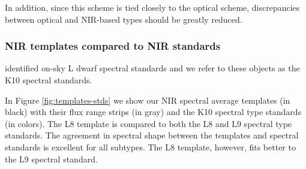 \documentclass[12pt,preprint]{aastex}
\begin{document}
	


In addition, since this scheme is tied closely to the optical scheme, discrepancies between optical and NIR-based types should be greatly reduced.

\subsubsection{NIR templates compared to NIR standards}

\citet{Kirkpatrick10} identified on-sky L dwarf spectral standards and we refer to these objects as the K10 spectral standards.

In Figure \ref{fig:templates-stds} we show our NIR spectral average templates (in black) with their flux range strips (in gray) and the K10 spectral type standards (in colors). The L8 template is compared to both the L8 and L9 spectral type standards. The agreement in spectral shape between the templates and spectral standards is excellent for all subtypes. The L8 template, however, fits better to the L9 spectral standard.
\end{document}
